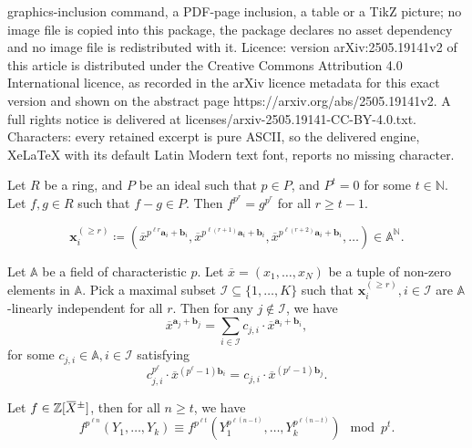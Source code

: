 \documentclass[10pt,a4paper]{amsart}
\newcommand{\A}{\mathbb{A}}
\newcommand{\N}{\mathbb{N}}
\newcommand{\Z}{\mathbb{Z}}
\newcommand{\ba}{\boldsymbol{a}}
\newcommand{\bb}{\boldsymbol{b}}
\newcommand{\bx}{\boldsymbol{x}}
\newcommand{\mI}{\mathcal{I}}
\newcommand{\oX}{\mkern 1.5mu\overline{\mkern-1.5mu X \mkern-1.5mu}\mkern 1.5mu}
\newcommand{\ox}{\overline{x}}
\begin{document}
graphics-inclusion command, a PDF-page inclusion, a table or a TikZ picture; no image file is copied into this package, the package declares no asset dependency and no image file is redistributed with it. Licence: version arXiv:2505.19141v2 of this article is distributed under the Creative Commons Attribution 4.0 International licence, as recorded in the arXiv licence metadata for this exact version and shown on the abstract page https://arxiv.org/abs/2505.19141v2. A full rights notice is delivered at licenses/arxiv-2505.19141-CC-BY-4.0.txt. Characters: every retained excerpt is pure ASCII, so the delivered engine, XeLaTeX with its default Latin Modern text font, reports no missing character.
\begin{lem}\label{lem:lifting}
    Let $R$ be a ring, and $P$ be an ideal such that $p \in P$, and $P^t = 0$ for some $t \in \N$.
    Let $f, g \in R$ such that $f - g \in P$. Then $f^{p^{r}} = g^{p^{r}}$ for all $r \geq t-1$.
\end{lem}

\begin{equation}\label{eq:defbxgeq}
\bx_i^{(\geq r)} \coloneqq (\ox^{p^{\ell r} \ba_i + \bb_i}, \ox^{p^{\ell (r+1)} \ba_i + \bb_i}, \ox^{p^{\ell (r+2)} \ba_i + \bb_i}, \ldots) \in \A^{\N}.
\end{equation}

\begin{lem}\label{lem:lindepmodp}
    Let $\A$ be a field of characteristic $p$.
    Let $\ox = (x_1, \ldots, x_N)$ be a tuple of non-zero elements in $\A$.
    Pick a maximal subset $\mI \subseteq \{1, \ldots, K\}$ such that $\bx_i^{(\geq r)}, i \in \mI$ are $\A$-linearly independent for all $r$.
    Then for any $j \notin \mI$, we have
    \begin{equation}\label{eq:linconda}
        \ox^{\ba_j + \bb_j} = \sum_{i \in \mI} c_{j,i} \cdot \ox^{\ba_i + \bb_i},
    \end{equation}
    for some $c_{j,i} \in \A, i \in \mI$ satisfying
    \begin{equation}\label{eq:lincondc}
        c_{j,i}^{p^{\ell}} \cdot \ox^{(p^{\ell} - 1) \bb_i} = c_{j,i} \cdot \ox^{(p^{\ell}-1)\bb_j}.
    \end{equation}
\end{lem}

\begin{lem}\label{lem:powpn}
    Let $f \in \Z[\oX^{\pm}]$, then for all $n \geq t$, we have 
    \[
    f^{p^{\ell n}}(Y_1, \ldots, Y_k) \equiv f^{p^{\ell t}}(Y_1^{p^{\ell (n-t)}}, \ldots, Y_k^{p^{\ell (n-t)}}) \mod p^t.
    \]
\end{lem}
\end{document}
